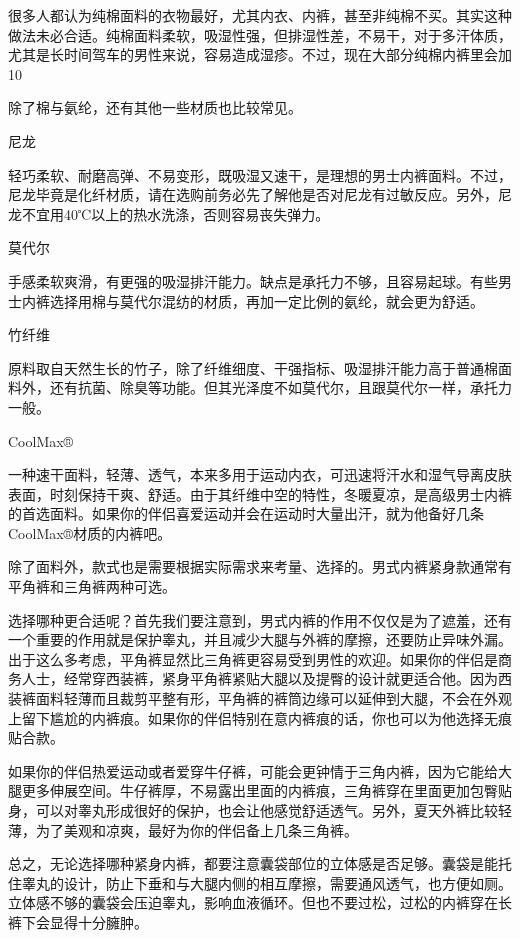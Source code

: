 \documentclass[12pt,UTF8]{ctexbook}
\begin{document}
很多人都认为纯棉面料的衣物最好，尤其内衣、内裤，甚至非纯棉不买。其实这种做法未必合适。纯棉面料柔软，吸湿性强，但排湿性差，不易干，对于多汗体质，尤其是长时间驾车的男性来说，容易造成湿疹。不过，现在大部分纯棉内裤里会加10%

除了棉与氨纶，还有其他一些材质也比较常见。

尼龙

轻巧柔软、耐磨高弹、不易变形，既吸湿又速干，是理想的男士内裤面料。不过，尼龙毕竟是化纤材质，请在选购前务必先了解他是否对尼龙有过敏反应。另外，尼龙不宜用40℃以上的热水洗涤，否则容易丧失弹力。

莫代尔

手感柔软爽滑，有更强的吸湿排汗能力。缺点是承托力不够，且容易起球。有些男士内裤选择用棉与莫代尔混纺的材质，再加一定比例的氨纶，就会更为舒适。

竹纤维

原料取自天然生长的竹子，除了纤维细度、干强指标、吸湿排汗能力高于普通棉面料外，还有抗菌、除臭等功能。但其光泽度不如莫代尔，且跟莫代尔一样，承托力一般。

CoolMax®

一种速干面料，轻薄、透气，本来多用于运动内衣，可迅速将汗水和湿气导离皮肤表面，时刻保持干爽、舒适。由于其纤维中空的特性，冬暖夏凉，是高级男士内裤的首选面料。如果你的伴侣喜爱运动并会在运动时大量出汗，就为他备好几条CoolMax®材质的内裤吧。

除了面料外，款式也是需要根据实际需求来考量、选择的。男式内裤紧身款通常有平角裤和三角裤两种可选。

选择哪种更合适呢？首先我们要注意到，男式内裤的作用不仅仅是为了遮羞，还有一个重要的作用就是保护睾丸，并且减少大腿与外裤的摩擦，还要防止异味外漏。出于这么多考虑，平角裤显然比三角裤更容易受到男性的欢迎。如果你的伴侣是商务人士，经常穿西装裤，紧身平角裤紧贴大腿以及提臀的设计就更适合他。因为西装裤面料轻薄而且裁剪平整有形，平角裤的裤筒边缘可以延伸到大腿，不会在外观上留下尴尬的内裤痕。如果你的伴侣特别在意内裤痕的话，你也可以为他选择无痕贴合款。

如果你的伴侣热爱运动或者爱穿牛仔裤，可能会更钟情于三角内裤，因为它能给大腿更多伸展空间。牛仔裤厚，不易露出里面的内裤痕，三角裤穿在里面更加包臀贴身，可以对睾丸形成很好的保护，也会让他感觉舒适透气。另外，夏天外裤比较轻薄，为了美观和凉爽，最好为你的伴侣备上几条三角裤。


总之，无论选择哪种紧身内裤，都要注意囊袋部位的立体感是否足够。囊袋是能托住睾丸的设计，防止下垂和与大腿内侧的相互摩擦，需要通风透气，也方便如厕。立体感不够的囊袋会压迫睾丸，影响血液循环。但也不要过松，过松的内裤穿在长裤下会显得十分臃肿。
\end{document}
